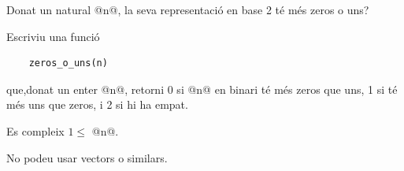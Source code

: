 

\Statement

Donat un natural @n@,
la seva representació en base 2 té més zeros o uns?

\medskip

Escriviu una funció

\begin{lstlisting}
    zeros_o_uns(n)
\end{lstlisting}

que,donat un enter @n@, retorni 0 si @n@ en binari té més zeros que uns,
1 si té més uns que zeros,
i 2 si hi ha empat.


\Precondition

Es compleix $1 \le$ @n@.


\ObservationNoMain


\Observation

No podeu usar vectors o similars.

